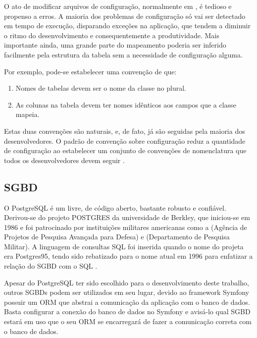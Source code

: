 O ato de modificar arquivos de configuração, normalmente em , é tedioso e propenso
a erros. A maioria dos problemas de configuração só vai ser detectado em tempo de execução,
disparando exceções na aplicação, que tendem a diminuir o ritmo do desenvolvimento e 
consequentemente a produtividade. Mais importante ainda, uma grande parte do
mapeamento poderia ser inferido facilmente pela estrutura da tabela sem a necessidade
de configuração alguma. 

Por exemplo, pode-se estabelecer uma convenção de que:
\begin{enumerate}
\item Nomes de tabelas devem ser o nome da classe no plural.
\item As colunas na tabela devem ter nomes idênticos aos campos que a classe mapeia.
\end{enumerate}

Estas duas convenções são naturais, e, de fato, já são seguidas pela maioria dos desenvolvedores.
O padrão de convenção sobre configuração reduz a quantidade de configuração ao estabelecer
um conjunto de convenções de nomenclatura que todos os desenvolvedores devem seguir \cite{Chen}.

\subsection{SGBD}
O PostgreSQL é um  livre, de código aberto,
bastante robusto e confiável. Derivou-se do projeto POSTGRES da universidade de Berkley, que 
iniciou-se em 1986 e foi patrocinado por instituições militares americanas como a 
 (Agência de Projetos de Pesquisa Avançada para Defesa) e  (Departamento de Pesquisa Militar).
A linguagem de consultas SQL foi inserida quando o nome do projeta era Postgres95, tendo sido
rebatizado para o nome atual em 1996 para enfatizar a relação do SGBD com o SQL \cite{postgresql}.

Apesar do PostgreSQL ter sido escolhido para o desenvolvimento deste trabalho, outros SGBDs
podem ser utilizados em seu lugar, devido ao framework Symfony possuir um ORM que abstrai
a comunicação da aplicação com o banco de dados. Basta configurar a conexão do banco de dados
no Symfony e avisá-lo qual SGBD estará em uso que o seu ORM se encarregará de fazer a comunicação
correta com o banco de dados.

